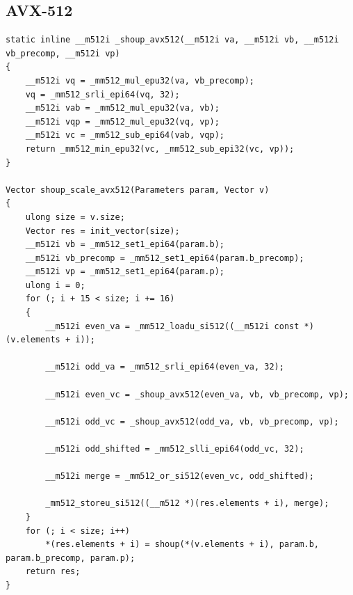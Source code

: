 \documentclass{article}
\begin{document}
\subsection{AVX-512}
\begin{lstlisting}[caption = Variant 1 (AVX-512)]
static inline __m512i _shoup_avx512(__m512i va, __m512i vb, __m512i vb_precomp, __m512i vp)
{
    __m512i vq = _mm512_mul_epu32(va, vb_precomp);
    vq = _mm512_srli_epi64(vq, 32);
    __m512i vab = _mm512_mul_epu32(va, vb);
    __m512i vqp = _mm512_mul_epu32(vq, vp);
    __m512i vc = _mm512_sub_epi64(vab, vqp);
    return _mm512_min_epu32(vc, _mm512_sub_epi32(vc, vp));
}

Vector shoup_scale_avx512(Parameters param, Vector v)
{
    ulong size = v.size;
    Vector res = init_vector(size);
    __m512i vb = _mm512_set1_epi64(param.b);
    __m512i vb_precomp = _mm512_set1_epi64(param.b_precomp);
    __m512i vp = _mm512_set1_epi64(param.p);
    ulong i = 0;
    for (; i + 15 < size; i += 16)
    {
        __m512i even_va = _mm512_loadu_si512((__m512i const *)(v.elements + i));

        __m512i odd_va = _mm512_srli_epi64(even_va, 32);

        __m512i even_vc = _shoup_avx512(even_va, vb, vb_precomp, vp);

        __m512i odd_vc = _shoup_avx512(odd_va, vb, vb_precomp, vp);

        __m512i odd_shifted = _mm512_slli_epi64(odd_vc, 32);

        __m512i merge = _mm512_or_si512(even_vc, odd_shifted);

        _mm512_storeu_si512((__m512 *)(res.elements + i), merge);
    }
    for (; i < size; i++)
        *(res.elements + i) = shoup(*(v.elements + i), param.b, param.b_precomp, param.p);
    return res;
}
\end{lstlisting}
\end{document}
